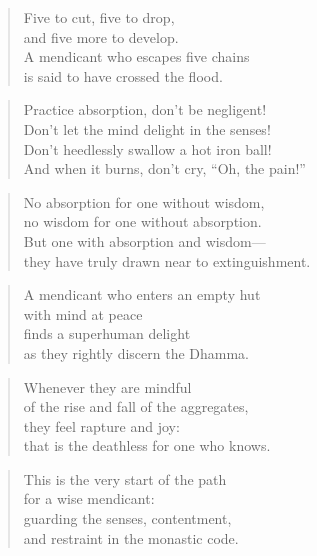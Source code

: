 \documentclass[12pt,openany]{book}%
\begin{document}
\begin{verse}%
Five to cut, five to drop, \\
and five more to develop. \\
A mendicant who escapes five chains \\
is said to have crossed the flood. 

%
\end{verse}

\begin{verse}%
Practice absorption, don’t be negligent! \\
Don’t let the mind delight in the senses! \\
Don’t heedlessly swallow a hot iron ball! \\
And when it burns, don’t cry, “Oh, the pain!” 

%
\end{verse}

\begin{verse}%
No absorption for one without wisdom, \\
no wisdom for one without absorption. \\
But one with absorption and wisdom—\\
they have truly drawn near to extinguishment. 

%
\end{verse}

\begin{verse}%
A mendicant who enters an empty hut \\
with mind at peace \\
finds a superhuman delight \\
as they rightly discern the Dhamma. 

%
\end{verse}

\begin{verse}%
Whenever they are mindful \\
of the rise and fall of the aggregates, \\
they feel rapture and joy: \\
that is the deathless for one who knows. 

%
\end{verse}

\begin{verse}%
This is the very start of the path \\
for a wise mendicant: \\
guarding the senses, contentment, \\
and restraint in the monastic code. 

%
\end{verse}
\end{document}
